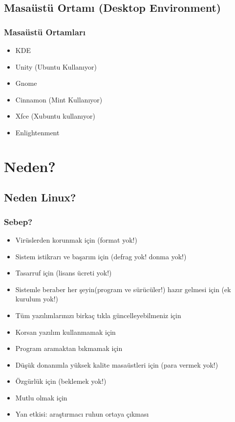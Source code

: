 \documentclass{beamer}
\begin{document}
	\subsection{Masaüstü Ortamı (Desktop Environment)}
		\begin{frame}
		 	\frametitle{Masaüstü Ortamları}
				\begin{itemize}
				 \item KDE
				 \item Unity (Ubuntu Kullanıyor)
				 \item Gnome
				 \item Cinnamon (Mint Kullanıyor)
				 \item Xfce (Xubuntu kullanıyor)
				 \item Enlightenment
				\end{itemize}

		\end{frame}
 

\section{Neden?}
	\subsection{Neden Linux?}
		\begin{frame}
		 	\frametitle{Sebep?}
			\begin{itemize}[<+->]
			 \item Virüslerden korunmak için (format yok!)
			 \item Sistem istikrarı ve başarım için (defrag yok! donma yok!)
			 \item Tasarruf için (lisans ücreti yok!)
			 \item Sistemle beraber her şeyin(program ve sürücüler!) hazır gelmesi için (ek kurulum yok!)
			 \item Tüm yazılımlarınızı birkaç tıkla güncelleyebilmeniz için
			 \item Korsan yazılım kullanmamak için
			 \item Program aramaktan bıkmamak için
			 \item Düşük donanımla yüksek kalite masaüstleri için (para vermek yok!)
			 \item Özgürlük için (beklemek yok!)
			 \item Mutlu olmak için
			 \item Yan etkisi: araştırmacı ruhun ortaya çıkması
			\end{itemize}

		\end{frame}
\end{document}
